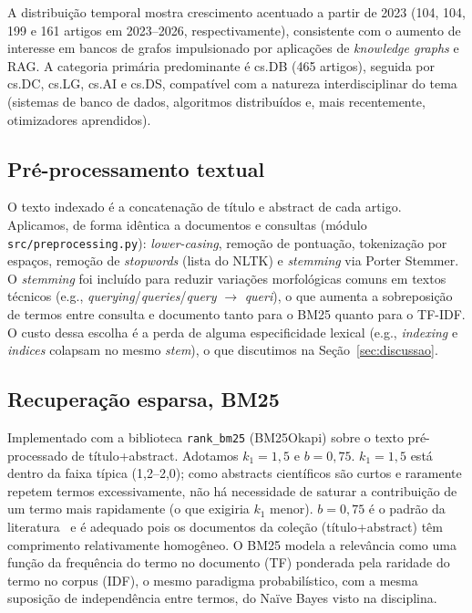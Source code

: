 \documentclass[12pt]{article}
\begin{document}
A distribuição temporal mostra crescimento acentuado a partir de 2023
(104, 104, 199 e 161 artigos em 2023--2026, respectivamente), consistente
com o aumento de interesse em bancos de grafos impulsionado por aplicações
de \textit{knowledge graphs} e RAG. A categoria primária predominante é
cs.DB (465 artigos), seguida por cs.DC, cs.LG, cs.AI e cs.DS, compatível
com a natureza interdisciplinar do tema (sistemas de banco de dados,
algoritmos distribuídos e, mais recentemente, otimizadores aprendidos).

\subsection{Pré-processamento textual}

O texto indexado é a concatenação de título e abstract de cada artigo.
Aplicamos, de forma idêntica a documentos e consultas (módulo
\texttt{src/preprocessing.py}): \textit{lower-casing}, remoção de pontuação,
tokenização por espaços, remoção de \textit{stopwords} (lista do NLTK) e
\textit{stemming} via Porter Stemmer. O \textit{stemming} foi incluído para
reduzir variações morfológicas comuns em textos técnicos (e.g.,
\textit{querying}/\textit{queries}/\textit{query} $\rightarrow$
\textit{queri}), o que aumenta a sobreposição de termos entre consulta e
documento tanto para o BM25 quanto para o TF-IDF. O custo dessa escolha é a
perda de alguma especificidade lexical (e.g., \textit{indexing} e
\textit{indices} colapsam no mesmo \textit{stem}), o que discutimos na
Seção~\ref{sec:discussao}.

\subsection{Recuperação esparsa, BM25}

Implementado com a biblioteca \texttt{rank\_bm25} (BM25Okapi) sobre o texto
pré-processado de título+abstract. Adotamos $k_1=1{,}5$ e $b=0{,}75$.
$k_1=1{,}5$ está dentro da faixa típica (1,2--2,0); como abstracts
científicos são curtos e raramente repetem termos excessivamente, não há
necessidade de saturar a contribuição de um termo mais rapidamente (o que
exigiria $k_1$ menor). $b=0{,}75$ é o padrão da
literatura~\cite{robertson2009bm25} e é adequado pois os documentos da
coleção (título+abstract) têm comprimento relativamente homogêneo. O BM25
modela a relevância como uma função da frequência do termo no documento
(TF) ponderada pela raridade do termo no corpus (IDF), o mesmo paradigma
probabilístico, com a mesma suposição de independência entre termos, do
Naïve Bayes visto na disciplina.
\end{document}
